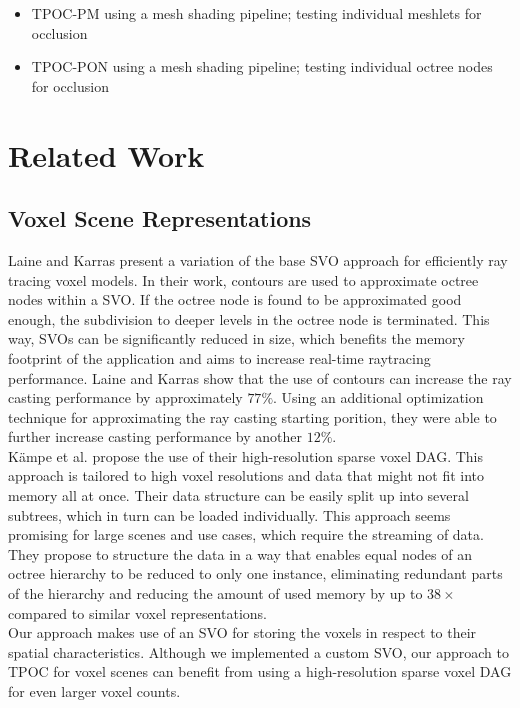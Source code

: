 \documentclass[conference]{IEEEtran}
\begin{document}
\begin{itemize}
    \item \ac{TPOC-PM} using a mesh shading pipeline; testing individual meshlets for occlusion 
    \item \ac{TPOC-PON} using a mesh shading pipeline; testing individual octree nodes for occlusion
\end{itemize}

\section{Related Work}

\subsection{Voxel Scene Representations} \label{subsec-voxel-scn-rep}

\noindent
Laine and Karras \cite{b6} present a variation of the base \ac{SVO} approach for efficiently 
ray tracing voxel models. In their work, contours are used to approximate octree nodes within 
a \ac{SVO}. If the octree node is found to be approximated good enough, the subdivision to 
deeper levels in the octree node is terminated. This way, \ac{SVO}s can be significantly 
reduced in size, which benefits the memory footprint of the application and aims to increase 
real-time raytracing performance. Laine and Karras show that the use of contours can increase 
the ray casting performance by approximately $77\%$. Using an additional optimization technique 
for approximating the ray casting starting porition, they were able to further increase casting 
performance by another $12\%$.  \\

\noindent
Kämpe et al. \cite{b2} propose the use of their high-resolution sparse voxel \ac{DAG}. 
This approach is tailored to high voxel resolutions and data that might not fit into 
memory all at once. Their data structure can be easily split up into several subtrees, 
which in turn can be loaded individually. This approach seems promising for large scenes 
and use cases, which require the streaming of data. They propose to structure the data in 
a way that enables equal nodes of an octree hierarchy to be reduced to only one instance, 
eliminating redundant parts of the hierarchy and reducing the amount of used memory by up 
to $38\times$ compared to similar voxel representations. \\

\noindent
Our approach makes use of an \ac{SVO} for storing the voxels in respect to their spatial 
characteristics. Although we implemented a custom \ac{SVO}, our approach to \ac{TPOC} for 
voxel scenes can benefit from using a high-resolution sparse voxel \ac{DAG} for even larger 
voxel counts.
\end{document}
